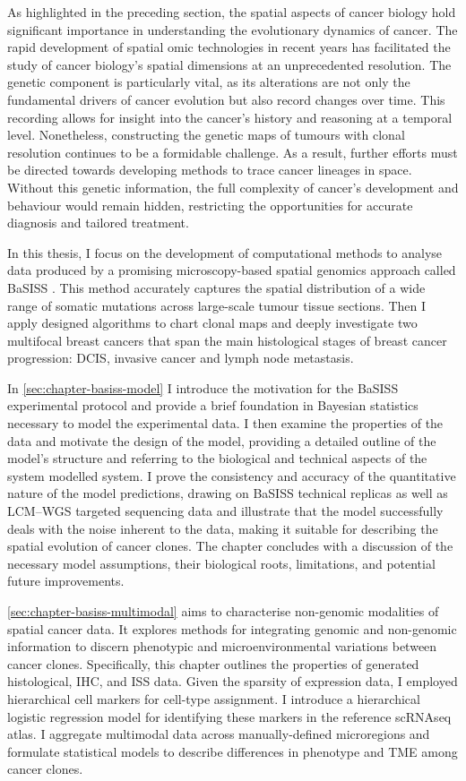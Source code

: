As highlighted in the preceding section, the spatial aspects of cancer biology hold significant importance in understanding the evolutionary dynamics of cancer. The rapid development of spatial omic technologies in recent years has facilitated the study of cancer biology's spatial dimensions at an unprecedented resolution. The genetic component is particularly vital, as its alterations are not only the fundamental drivers of cancer evolution but also record changes over time. This recording allows for insight into the cancer's history and reasoning at a temporal level. Nonetheless, constructing the genetic maps of tumours with clonal resolution continues to be a formidable challenge. As a result, further efforts must be directed towards developing methods to trace cancer lineages in space. Without this genetic information, the full complexity of cancer's development and behaviour would remain hidden, restricting the opportunities for accurate diagnosis and tailored treatment.

In this thesis, I focus on the development of computational methods to analyse data produced by a promising microscopy-based spatial genomics approach called \acf{BaSISS} \parencite{Lomakin2022-ks}. This method accurately captures the spatial distribution of a wide range of somatic mutations across large-scale tumour tissue sections. Then I apply designed algorithms to chart clonal maps and deeply investigate two multifocal breast cancers that span the main histological stages of breast cancer progression: \acl{DCIS}, invasive cancer and lymph node metastasis. 

In \cref{sec:chapter-basiss-model} I introduce the motivation for the \ac{BaSISS} experimental protocol and provide a brief foundation in Bayesian statistics necessary to model the experimental data. I then examine the properties of the data and motivate the design of the model, providing a detailed outline of the model's structure and referring to the biological and technical aspects of the system modelled system. I prove the consistency and accuracy of the quantitative nature of the model predictions, drawing on \ac{BaSISS} technical replicas as well as \acs{LCM}–\acs{WGS} targeted sequencing data and illustrate that the model successfully deals with the noise inherent to the data, making it suitable for describing the spatial evolution of cancer clones. The chapter concludes with a discussion of the necessary model assumptions, their biological roots, limitations, and potential future improvements.

\cref{sec:chapter-basiss-multimodal} aims to characterise non-genomic modalities of spatial cancer data. It explores methods for integrating genomic and non-genomic information to discern phenotypic and microenvironmental variations between cancer clones. Specifically, this chapter outlines the properties of generated histological, \acf{IHC}, and \acf{ISS} data. Given the sparsity of expression data, I employed hierarchical cell markers for cell-type assignment. I introduce a hierarchical logistic regression model for identifying these markers in the reference \ac{scRNAseq} atlas. I aggregate multimodal data across manually-defined microregions and formulate statistical models to describe differences in phenotype and \acs{TME} among cancer clones.  

